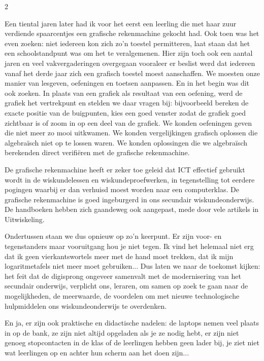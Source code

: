 \begin{multicols}{2}


Een tiental jaren later had ik voor het eerst een leerling die met haar zuur verdiende spaarcentjes een grafische rekenmachine gekocht had. Ook toen was het even zoeken: niet iedereen kon zich zo’n toestel permitteren, laat staan dat het een schoolstandpunt was om het te veralgemenen. Hier zijn toch ook een aantal jaren en veel vakvergaderingen overgegaan vooraleer er beslist werd dat iedereen vanaf het derde jaar zich een grafisch toestel moest aanschaffen. We moesten onze manier van lesgeven, oefeningen en toetsen aanpassen. En in het begin was dit ook zoeken. In plaats van een grafiek als resultaat van een oefening, werd de grafiek het vertrekpunt en stelden we daar vragen bij: bijvoorbeeld bereken de exacte positie van de buigpunten, kies een goed venster zodat de grafiek goed zichtbaar is of zoom in op een deel van de grafiek. We konden oefeningen geven die niet meer zo mooi uitkwamen. We konden vergelijkingen grafisch oplossen die algebraïsch niet op te lossen waren. We konden oplossingen die we algebraïsch berekenden direct verifiëren met de grafische rekenmachine.

De grafische rekenmachine heeft er zeker toe geleid dat ICT effectief gebruikt wordt in de wiskundelessen en wiskundeproefwerken, in tegenstelling tot eerdere pogingen waarbij er dan verhuisd moest worden naar een computerklas. De grafische rekenmachine is goed ingeburgerd in ons secundair wiskundeonderwijs. De handboeken hebben zich gaandeweg ook aangepast, mede door vele artikels in Uitwiskeling.

Ondertussen staan we dus opnieuw op zo’n keerpunt. Er zijn voor- en tegenstanders maar vooruitgang hou je niet tegen. Ik vind het helemaal niet erg dat ik geen vierkantswortels meer met de hand moet trekken, dat ik mijn logaritmetafels niet meer moet gebruiken... Dus laten we naar de toekomst kijken: het feit dat de digisprong ongeveer samenvalt met de modernisering van het secundair onderwijs, verplicht ons, leraren, om samen op zoek te gaan naar de mogelijkheden, de meerwaarde, de voordelen om met nieuwe technologische hulpmiddelen ons wiskundeonderwijs te overdenken.

En ja, er zijn ook praktische en didactische nadelen: de laptops nemen veel plaats in op de bank, ze zijn niet altijd opgeladen als je ze nodig hebt, er zijn niet genoeg stopcontacten in de klas of de leerlingen hebben geen lader bij, je ziet niet wat leerlingen op en achter hun scherm aan het doen zijn... 


\end{multicols}
